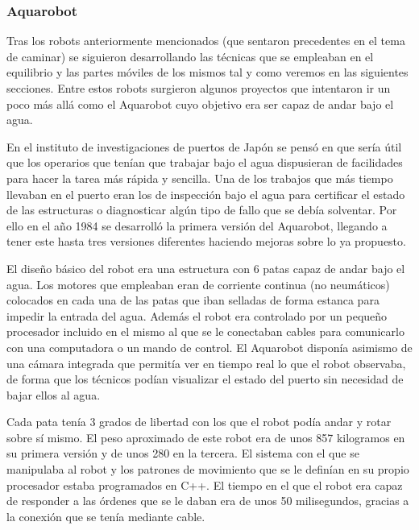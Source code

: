\subsubsection{Aquarobot}
Tras los robots anteriormente mencionados (que sentaron precedentes en el tema de caminar) se siguieron desarrollando las técnicas que se empleaban en el equilibrio y las partes móviles de los mismos tal y como veremos en las siguientes secciones. Entre estos robots surgieron algunos proyectos que intentaron ir un poco más allá como el Aquarobot cuyo objetivo era ser capaz de andar bajo el agua.

\vspace{10px}

En el instituto de investigaciones de puertos de Japón se pensó en que sería útil que los operarios que tenían que trabajar bajo el agua dispusieran de facilidades para hacer la tarea más rápida y sencilla. Una de los trabajos que más tiempo llevaban en el puerto eran los de inspección bajo el agua para certificar el estado de las estructuras o diagnosticar algún tipo de fallo que se debía solventar. Por ello en el año 1984 se desarrolló la primera versión del Aquarobot, llegando a tener este hasta tres versiones diferentes haciendo mejoras sobre lo ya propuesto.

\vspace{10px}

El diseño básico del robot era una estructura con 6 patas capaz de andar bajo el agua. Los motores que empleaban eran de corriente continua (no neumáticos) colocados en cada una de las patas que iban selladas de forma estanca para impedir la entrada del agua. Además el robot era controlado por un pequeño procesador incluido en el mismo al que se le conectaban cables para comunicarlo con una computadora o un mando de control. El Aquarobot disponía asimismo de una cámara integrada que permitía ver en tiempo real lo que el robot observaba, de forma que los técnicos podían visualizar el estado del puerto sin necesidad de bajar ellos al agua.

\vspace{10px}

Cada pata tenía 3 grados de libertad con los que el robot podía andar y rotar sobre sí mismo. El peso aproximado de este robot era de unos 857 kilogramos en su primera versión y de unos 280 en la tercera. El sistema con el que se manipulaba al robot y los patrones de movimiento que se le definían en su propio procesador estaba programados en C++. El tiempo en el que el robot era capaz de responder a las órdenes que se le daban era de unos 50 milisegundos, gracias a la conexión que se tenía mediante cable.

